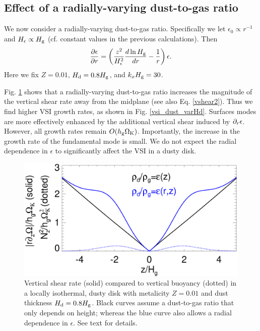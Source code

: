 \subsection{Effect of a radially-varying dust-to-gas ratio}\label{varHd}

We now consider a radially-varying dust-to-gas ratio. Specifically we
let $\epsilon_0\propto r^{-1}$ and $H_\epsilon \propto H_\mathrm{g}$
(cf. constant values in the previous calculations). Then
\begin{align*} 
  \frac{\partial\epsilon}{\partial r} =
  \left(\frac{z^2}{H_\epsilon^2}\frac{d\ln{H_\mathrm{g}}}{dr} -
    \frac{1}{r}\right)\epsilon.   
\end{align*}
Here we fix $Z=0.01$, $H_\mathrm{d}=0.8H_\mathrm{g}$, and $k_xH_\mathrm{g}=30$.       

Fig. \ref{compare_vshear_varHd} shows that a radially-varying
dust-to-gas ratio increases the magnitude of the vertical shear rate
away from the midplane (see also Eq. \ref{vshear2}). Thus we find
higher VSI growth rates, as shown in Fig. \ref{vsi_dust_varHd}. 
Surfaces modes are more effectively enhanced by the additional vertical 
shear induced by $\partial_r\epsilon$. However, all growth rates remain
$O(h_\mathrm{g}\Omega_{\rm K})$. Importantly, the increase in the growth rate of the
fundamental mode is small. We do not expect the radial
dependence in $\epsilon$ to significantly affect the VSI in a dusty
disk. 

\begin{figure}
  \includegraphics[width=\linewidth]{figures/compare_vshear_Nz2_varHd} 
  \caption{Vertical shear rate (solid) compared to vertical buoyancy
    (dotted) in a locally isothermal, dusty disk 
    with metalicity $Z=0.01$ and dust thickness $H_\mathrm{d}=0.8H_\mathrm{g}$.
    Black curves assume a dust-to-gas ratio that only depends on
    height; whereas the blue curve also allows a radial dependence in
    $\epsilon$. See text for details.  
    \label{compare_vshear_varHd}
    }
\end{figure}



